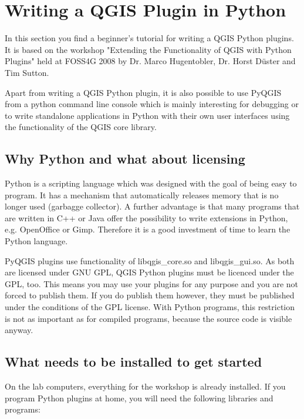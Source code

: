 \section{Writing a QGIS Plugin in Python}

\updatedisclaimer

In this section you find a beginner's tutorial for writing a QGIS Python
plugins. It is based on the workshop "Extending the Functionality of QGIS
with Python Plugins" held at FOSS4G 2008 by Dr. Marco Hugentobler, Dr. Horst
D\"uster and Tim Sutton. 

Apart from writing a QGIS Python plugin, it is also possible to use PyQGIS
from a python command line console which is mainly interesting for debugging
or to write standalone applications in Python with their own user interfaces
using the functionality of the QGIS core library.

\subsection{Why Python and what about licensing}

Python is a scripting language which was designed with the goal of being easy
to program. It has a mechanism that automatically releases memory that is no
longer used (garbagge collector). A further advantage is that many programs
that are written in C++ or Java offer the possibility to write extensions in
Python, e.g. OpenOffice or Gimp. Therefore it is a good investment of time to
learn the Python language.

PyQGIS plugins use functionality of libqgis\_core.so and libqgis\_gui.so. As
both are licensed under GNU GPL, QGIS Python plugins must be licenced under the
GPL, too. This means you may use your plugins for any purpose and you are not
forced to publish them. If you do publish them however, they must be
published under the conditions of the GPL license. With Python programs, this
restriction is not as important as for compiled programs, because the source
code is visible anyway.

\subsection{What needs to be installed to get started}

On the lab computers, everything for the workshop is already installed. If
you program Python plugins at home, you will need the following libraries and
programs:

